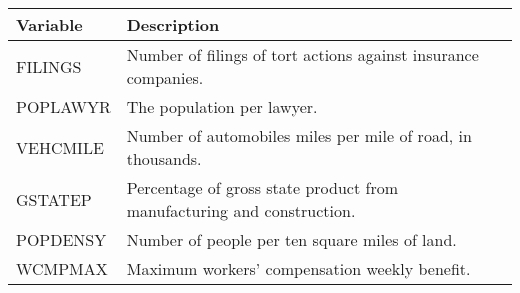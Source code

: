 \documentclass[]{book}
\begin{document}
\begin{longtable}[]{@{}ll@{}}
\toprule
\begin{minipage}[b]{0.54\columnwidth}\raggedright
Variable\strut
\end{minipage} & \begin{minipage}[b]{0.40\columnwidth}\raggedright
Description\strut
\end{minipage}\tabularnewline
\midrule
\endhead
\begin{minipage}[t]{0.54\columnwidth}\raggedright
FILINGS\strut
\end{minipage} & \begin{minipage}[t]{0.40\columnwidth}\raggedright
Number of filings of tort actions against insurance companies.\strut
\end{minipage}\tabularnewline
\begin{minipage}[t]{0.54\columnwidth}\raggedright
POPLAWYR\strut
\end{minipage} & \begin{minipage}[t]{0.40\columnwidth}\raggedright
The population per lawyer.\strut
\end{minipage}\tabularnewline
\begin{minipage}[t]{0.54\columnwidth}\raggedright
VEHCMILE\strut
\end{minipage} & \begin{minipage}[t]{0.40\columnwidth}\raggedright
Number of automobiles miles per mile of road, in thousands.\strut
\end{minipage}\tabularnewline
\begin{minipage}[t]{0.54\columnwidth}\raggedright
GSTATEP\strut
\end{minipage} & \begin{minipage}[t]{0.40\columnwidth}\raggedright
Percentage of gross state product from manufacturing and construction.\strut
\end{minipage}\tabularnewline
\begin{minipage}[t]{0.54\columnwidth}\raggedright
POPDENSY\strut
\end{minipage} & \begin{minipage}[t]{0.40\columnwidth}\raggedright
Number of people per ten square miles of land.\strut
\end{minipage}\tabularnewline
\begin{minipage}[t]{0.54\columnwidth}\raggedright
WCMPMAX\strut
\end{minipage} & \begin{minipage}[t]{0.40\columnwidth}\raggedright
Maximum workers' compensation weekly benefit.\strut

\end{minipage}
\end{longtable}
\end{document}
